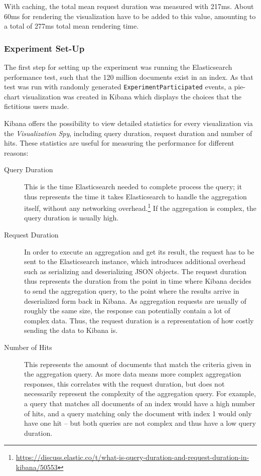 With caching, the total mean request duration was measured with 217ms.
About 60ms for rendering the visualization have to be added to this value, amounting to a total of 277ms total mean rendering time.

\subsubsection{Experiment Set-Up}

The first step for setting up the experiment was running the Elasticsearch performance test, such that the 120 million documents exist in an index.
As that test was run with randomly generated \texttt{ExperimentParticipated} events, a pie-chart visualization was created in Kibana which displays the choices that the fictitious users made.

Kibana offers the possibility to view detailed statistics for every visualization via the \emph{Visualization Spy}, including query duration, request duration and number of hits.
These statistics are useful for measuring the performance for different reasons:

\begin{description}
\item[Query Duration] This is the time Elasticsearch needed to complete process the query; it thus represents the time it takes Elasticsearch to handle the aggregation itself, without any networking overhead.\footnote{\url{https://discuss.elastic.co/t/what-is-query-duration-and-request-duration-in-kibana/50553}}
If the aggregation is complex, the query duration is usually high.
\item[Request Duration] In order to execute an aggregation and get its result, the request has to be sent to the Elasticsearch instance, which introduces additional overhead such as serializing and deserializing \ac{JSON} objects.
The request duration thus represents the duration from the point in time where Kibana decides to send the aggregation query, to the point where the results arrive in deserialized form back in Kibana.
As aggregation requests are usually of roughly the same size, the response can potentially contain a lot of complex data.
Thus, the request duration is a representation of how costly sending the data to Kibana is.
\item[Number of Hits] This represents the amount of documents that match the criteria given in the aggregation query.
As more data means more complex aggregation responses, this correlates with the request duration, but does not necessarily represent the complexity of the aggregation query.
For example, a query that matches all documents of an index would have a high number of hits, and a query matching only the document with index 1 would only have one hit -- but both queries are not complex and thus have a low query duration.
\end{description}

